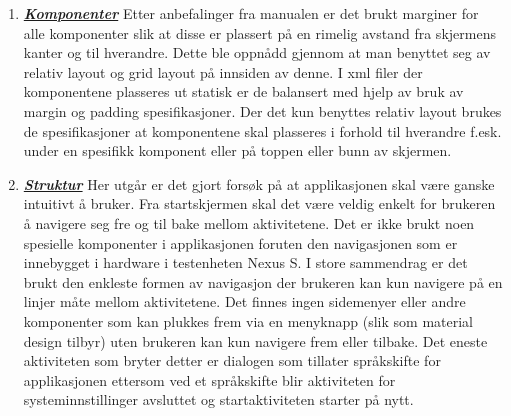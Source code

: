 \begin{enumerate}
\item \textbf{\textsl{\href{https://www.google.com/design/spec/components/bottom-sheets.html}{Komponenter}}}
Etter anbefalinger fra manualen er det brukt marginer for alle komponenter slik at disse er plassert på en rimelig avstand fra skjermens kanter og til hverandre. Dette ble oppnådd gjennom at man benyttet seg av relativ layout og grid layout på innsiden av denne. I xml filer der komponentene plasseres ut statisk er de balansert med hjelp av bruk av margin og padding spesifikasjoner. Der det kun benyttes relativ layout brukes de spesifikasjoner at komponentene skal plasseres i forhold til hverandre f.esk. under en spesifikk komponent eller på toppen eller bunn av skjermen. 

\item \textbf{\textsl{\href{https://www.google.com/design/spec/patterns/app-structure.html}{Struktur}}}
Her utgår er det gjort forsøk på at applikasjonen skal være ganske intuitivt å bruker. Fra startskjermen skal det være veldig enkelt for brukeren å navigere seg fre og til bake mellom aktivitetene. Det er ikke brukt noen spesielle komponenter i applikasjonen foruten den navigasjonen som er innebygget i hardware i testenheten Nexus S. I store sammendrag er det brukt den enkleste formen av navigasjon der brukeren kan kun navigere på en linjer måte mellom aktivitetene. Det finnes ingen sidemenyer eller andre komponenter som kan plukkes frem via en menyknapp (slik som material design tilbyr) uten brukeren kan kun navigere frem eller tilbake. Det eneste aktiviteten som bryter detter er dialogen som tillater språkskifte for applikasjonen ettersom ved et språkskifte blir aktiviteten for systeminnstillinger avsluttet og startaktiviteten starter på nytt. 

\end{enumerate} 


